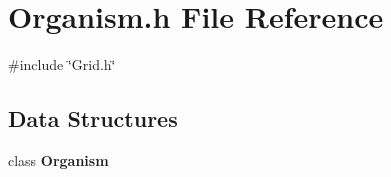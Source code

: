 \section{Organism.\+h File Reference}
\label{Organism_8h}
{\ttfamily \#include \char`\"{}Grid.\+h\char`\"{}}\newline
\subsection*{Data Structures}
\begin{DoxyCompactItemize}
\item 
class \textbf{ Organism}
\end{DoxyCompactItemize}
